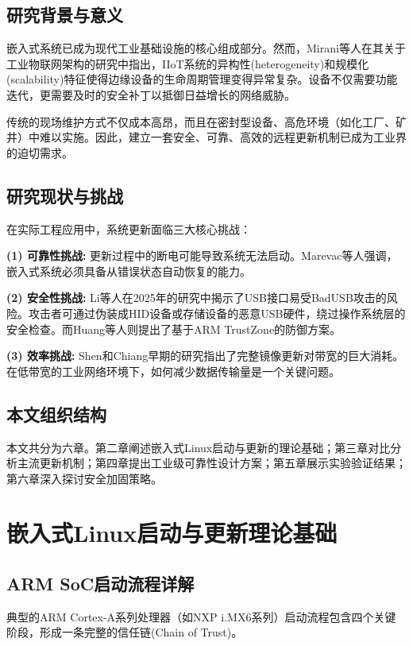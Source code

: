 \documentclass[a4paper,12pt]{article}
\begin{document}
\subsection{研究背景与意义}
嵌入式系统已成为现代工业基础设施的核心组成部分。然而，Mirani等人在其关于工业物联网架构的研究中指出，IIoT系统的异构性(heterogeneity)和规模化(scalability)特征使得边缘设备的生命周期管理变得异常复杂\cite{Mirani2022}。设备不仅需要功能迭代，更需要及时的安全补丁以抵御日益增长的网络威胁。

传统的现场维护方式不仅成本高昂，而且在密封型设备、高危环境（如化工厂、矿井）中难以实施。因此，建立一套安全、可靠、高效的远程更新机制已成为工业界的迫切需求。

\subsection{研究现状与挑战}
在实际工程应用中，系统更新面临三大核心挑战：

\textbf{(1) 可靠性挑战:} 更新过程中的断电可能导致系统无法启动。Marevac等人强调，嵌入式系统必须具备从错误状态自动恢复的能力\cite{Marevac2025}。

\textbf{(2) 安全性挑战:} Li等人在2025年的研究中揭示了USB接口易受BadUSB攻击的风险\cite{Li2025}。攻击者可通过伪装成HID设备或存储设备的恶意USB硬件，绕过操作系统层的安全检查。而Huang等人则提出了基于ARM TrustZone的防御方案\cite{Huang2022}。

\textbf{(3) 效率挑战:} Shen和Chiang早期的研究指出了完整镜像更新对带宽的巨大消耗\cite{Shen2007}。在低带宽的工业网络环境下，如何减少数据传输量是一个关键问题。

\subsection{本文组织结构}
本文共分为六章。第二章阐述嵌入式Linux启动与更新的理论基础；第三章对比分析主流更新机制；第四章提出工业级可靠性设计方案；第五章展示实验验证结果；第六章深入探讨安全加固策略。

\newpage
\section{嵌入式Linux启动与更新理论基础}

\subsection{ARM SoC启动流程详解}
典型的ARM Cortex-A系列处理器（如NXP i.MX6系列）启动流程包含四个关键阶段，形成一条完整的信任链(Chain of Trust)。
\end{document}

